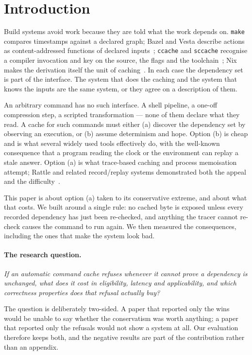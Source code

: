 \section{Introduction}

Build systems avoid work because they are told what the work depends on. \texttt{make} compares
timestamps against a declared graph; Bazel and Vesta describe actions as content-addressed
functions of declared inputs~\cite{bazel,vesta}; \texttt{ccache} and \texttt{sccache} recognise a
compiler invocation and key on the source, the flags and the toolchain~\cite{ccache,sccache}; Nix
makes the derivation itself the unit of caching~\cite{nixos}. In each case the dependency set is
part of the interface. The system that does the caching and the system that knows the inputs are
the same system, or they agree on a description of them.

An arbitrary command has no such interface. A shell pipeline, a one-off compression step, a
scripted transformation --- none of them declare what they read. A cache for such commands must
either (a) discover the dependency set by observing an execution, or (b) assume determinism and
hope. Option (b) is cheap and is what several widely used tools effectively do, with the well-known
consequence that a program reading the clock or the environment can replay a stale answer. Option
(a) is what trace-based caching and process memoisation attempt; Rattle and related
record/replay systems demonstrated both the appeal and the difficulty~\cite{rr}.

This paper is about option (a) taken to its conservative extreme, and about what that costs. We
built \tracejit{} around a single rule: no cached byte is exposed unless every recorded dependency
has just been re-checked, and anything the tracer cannot re-check causes the command to run again.
We then measured the consequences, including the ones that make the system look bad.

\paragraph{The research question.}
\emph{If an automatic command cache refuses whenever it cannot prove a dependency is unchanged,
what does it cost in eligibility, latency and applicability, and which correctness properties does
that refusal actually buy?}

The question is deliberately two-sided. A paper that reported only the wins would be unable to say
whether the conservatism was worth anything; a paper that reported only the refusals would not show
a system at all. Our evaluation therefore keeps both, and the negative results are part of the
contribution rather than an appendix.

